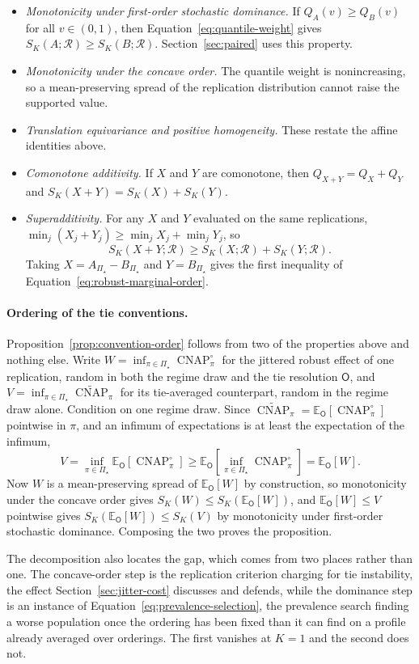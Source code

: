 \documentclass[11pt]{article}
\newcommand{\CNAP}{\operatorname{CNAP}}
\newcommand{\Regime}{\mathcal{R}}
\newcommand{\PSet}{\Pi_\star}
\newcommand{\E}{\mathbb{E}}
\newcommand{\CNAPta}{\widetilde{\CNAP}}
\newcommand{\Rank}{\mathsf{O}}
\newcommand{\CNAPj}{\CNAP^{\circ}}
\theoremstyle{remark}
\begin{document}
\begin{itemize}
\item \emph{Monotonicity under first-order stochastic dominance.} If $Q_A(v)\geq Q_B(v)$ for all $v\in(0,1)$, then Equation~\eqref{eq:quantile-weight} gives $S_K(A;\Regime)\geq S_K(B;\Regime)$. Section~\ref{sec:paired} uses this property.
\item \emph{Monotonicity under the concave order.} The quantile weight is nonincreasing, so a mean-preserving spread of the replication distribution cannot raise the supported value.
\item \emph{Translation equivariance and positive homogeneity.} These restate the affine identities above.
\item \emph{Comonotone additivity.} If $X$ and $Y$ are comonotone, then $Q_{X+Y}=Q_X+Q_Y$ and $S_K(X+Y)=S_K(X)+S_K(Y)$.
\item \emph{Superadditivity.} For any $X$ and $Y$ evaluated on the same replications, $\min_j(X_j+Y_j)\geq\min_jX_j+\min_jY_j$, so
\[
S_K(X+Y;\Regime)
\geq
S_K(X;\Regime)+S_K(Y;\Regime).
\]
Taking $X=A_{\PSet}-B_{\PSet}$ and $Y=B_{\PSet}$ gives the first inequality of Equation~\eqref{eq:robust-marginal-order}.
\end{itemize}

\paragraph{Ordering of the tie conventions.}
Proposition~\ref{prop:convention-order} follows from two of the properties above and nothing else. Write $W=\inf_{\pi\in\PSet}\CNAPj_\pi$ for the jittered robust effect of one replication, random in both the regime draw and the tie resolution $\Rank$, and $V=\inf_{\pi\in\PSet}\CNAPta_\pi$ for its tie-averaged counterpart, random in the regime draw alone. Condition on one regime draw. Since $\CNAPta_\pi=\E_{\Rank}[\CNAPj_\pi]$ pointwise in $\pi$, and an infimum of expectations is at least the expectation of the infimum,
\[
V
=
\inf_{\pi\in\PSet}\E_{\Rank}\left[\CNAPj_\pi\right]
\geq
\E_{\Rank}\left[\inf_{\pi\in\PSet}\CNAPj_\pi\right]
=
\E_{\Rank}[W].
\]
Now $W$ is a mean-preserving spread of $\E_{\Rank}[W]$ by construction, so monotonicity under the concave order gives $S_K(W)\leq S_K(\E_{\Rank}[W])$, and $\E_{\Rank}[W]\leq V$ pointwise gives $S_K(\E_{\Rank}[W])\leq S_K(V)$ by monotonicity under first-order stochastic dominance. Composing the two proves the proposition.

The decomposition also locates the gap, which comes from two places rather than one. The concave-order step is the replication criterion charging for tie instability, the effect Section~\ref{sec:jitter-cost} discusses and defends, while the dominance step is an instance of Equation~\eqref{eq:prevalence-selection}, the prevalence search finding a worse population once the ordering has been fixed than it can find on a profile already averaged over orderings. The first vanishes at $K=1$ and the second does not.
\end{document}
